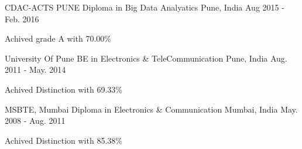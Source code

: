

\begin{cventries}

 \cventry
    {CDAC-ACTS PUNE} %
    {Diploma in Big Data Analyatics} %
    {Pune, India} %
    {Aug 2015 - Feb. 2016} %
    {
      \begin{cvitems} %
        \item {Achived grade A with 70.00\%}
      \end{cvitems}
    }

  \cventry
    {University Of Pune} %
    {BE in Electronics \& TeleCommunication} %
    {Pune, India} %
    {Aug. 2011 - May. 2014} %
    {
      \begin{cvitems} %
        \item {Achived Distinction with 69.33\%}
      \end{cvitems}
    }

  \cventry
    {MSBTE, Mumbai} %
    {Diploma in  Electronics \& Communication} %
    {Mumbai, India} %
    {May. 2008 - Aug. 2011} %
    {
      \begin{cvitems} %
        \item {Achived Distinction with 85.38\%}
      \end{cvitems}
    }

\end{cventries}
